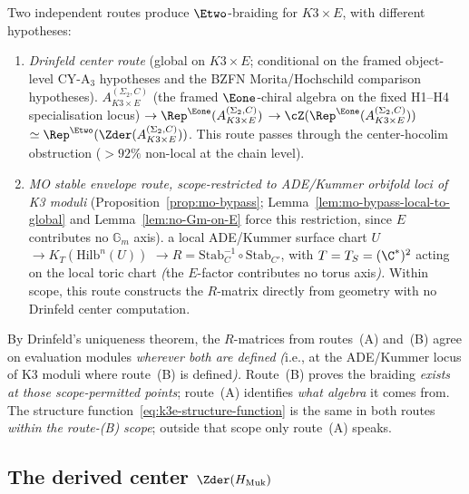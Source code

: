 \begin{remark}
\label{rem:two-routes-k3e}
Two independent routes produce $\Etwo$-braiding for $K3 \times E$,
with different hypotheses:
\begin{enumerate}[label=\textup{(\Alph*)}]
 \item \emph{Drinfeld center route} (global on $K3 \times E$;
 conditional on the framed object-level CY-A$_3$ hypotheses and the
 BZFN Morita/Hochschild comparison hypotheses).
 $A_{K3 \times E}^{(\Sigma_2,C)}$ (the framed $\Eone$-chiral algebra
 on the fixed H1--H4 specialisation locus)
 $\to \Rep^{\Eone}(A_{K3 \times E}^{(\Sigma_2,C)})$
 $\to \cZ(\Rep^{\Eone}(A_{K3 \times E}^{(\Sigma_2,C)}))$
 $\simeq \Rep^{\Etwo}(\Zder(A_{K3 \times E}^{(\Sigma_2,C)}))$.
 This route passes through the center-hocolim obstruction
 ($>92\%$ non-local at the chain level).
 \item \emph{MO stable envelope route, scope-restricted to
 ADE/Kummer orbifold loci of K3 moduli} (Proposition~\ref{prop:mo-bypass};
 Lemma~\ref{lem:mo-bypass-local-to-global} and
 Lemma~\ref{lem:no-Gm-on-E} force this restriction, since $E$
 contributes no $\mathbb{G}_m$ axis).
 a local ADE/Kummer surface chart \(U\)
 $\to K_T(\mathrm{Hilb}^n(U))$
 $\to R = \mathrm{Stab}_C^{-1} \circ \mathrm{Stab}_{C'}$,
 with $T = T_S = (\C^*)^2$ acting on the local toric chart
 \emph{(}the $E$-factor contributes no torus axis\emph{).}
 Within scope, this route constructs the $R$-matrix directly from
 geometry with no Drinfeld center computation.
\end{enumerate}
By Drinfeld's uniqueness theorem, the $R$-matrices from
routes~(A) and~(B) agree on evaluation modules \emph{wherever both
are defined} \emph{(}i.e., at the ADE/Kummer locus of K3 moduli where
route~(B) is defined\emph{).} Route~(B) proves the braiding
\emph{exists at those scope-permitted points}; route~(A) identifies
\emph{what algebra} it comes from. The structure
function~\eqref{eq:k3e-structure-function} is the same in both
routes \emph{within the route-(B) scope}; outside that scope only
route~(A) speaks.
\end{remark}


\subsection{The derived center \texorpdfstring{$\Zder(H_{\mathrm{Muk}})$}{Zder(H-Muk)}}
\label{subsec:derived-center-hmuk}

